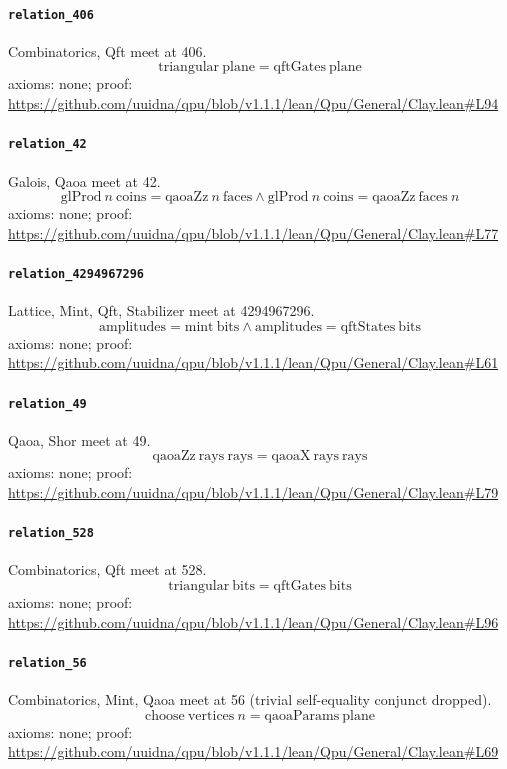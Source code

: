 \documentclass[11pt]{article}
\begin{document}
\paragraph{\texttt{relation\_406}}
Combinatorics, Qft meet at 406.
\[ \mathrm{triangular}\ \mathrm{plane} = \mathrm{qftGates}\ \mathrm{plane} \]
\noindent axioms: none; proof: \url{https://github.com/uuidna/qpu/blob/v1.1.1/lean/Qpu/General/Clay.lean\#L94}

\paragraph{\texttt{relation\_42}}
Galois, Qaoa meet at 42.
\[ \mathrm{glProd}\ n\ \mathrm{coins} = \mathrm{qaoaZz}\ n\ \mathrm{faces} \land \mathrm{glProd}\ n\ \mathrm{coins} = \mathrm{qaoaZz}\ \mathrm{faces}\ n \]
\noindent axioms: none; proof: \url{https://github.com/uuidna/qpu/blob/v1.1.1/lean/Qpu/General/Clay.lean\#L77}

\paragraph{\texttt{relation\_4294967296}}
Lattice, Mint, Qft, Stabilizer meet at 4294967296.
\[ \mathrm{amplitudes} = \mathrm{mint}\ \mathrm{bits} \land \mathrm{amplitudes} = \mathrm{qftStates}\ \mathrm{bits} \]
\noindent axioms: none; proof: \url{https://github.com/uuidna/qpu/blob/v1.1.1/lean/Qpu/General/Clay.lean\#L61}

\paragraph{\texttt{relation\_49}}
Qaoa, Shor meet at 49.
\[ \mathrm{qaoaZz}\ \mathrm{rays}\ \mathrm{rays} = \mathrm{qaoaX}\ \mathrm{rays}\ \mathrm{rays} \]
\noindent axioms: none; proof: \url{https://github.com/uuidna/qpu/blob/v1.1.1/lean/Qpu/General/Clay.lean\#L79}

\paragraph{\texttt{relation\_528}}
Combinatorics, Qft meet at 528.
\[ \mathrm{triangular}\ \mathrm{bits} = \mathrm{qftGates}\ \mathrm{bits} \]
\noindent axioms: none; proof: \url{https://github.com/uuidna/qpu/blob/v1.1.1/lean/Qpu/General/Clay.lean\#L96}

\paragraph{\texttt{relation\_56}}
Combinatorics, Mint, Qaoa meet at 56 (trivial self-equality conjunct dropped).
\[ \mathrm{choose}\ \mathrm{vertices}\ n = \mathrm{qaoaParams}\ \mathrm{plane} \]
\noindent axioms: none; proof: \url{https://github.com/uuidna/qpu/blob/v1.1.1/lean/Qpu/General/Clay.lean\#L69}
\end{document}

